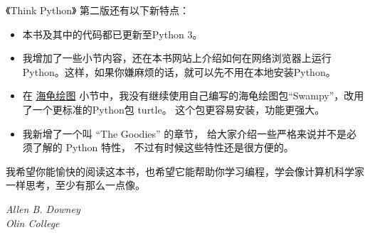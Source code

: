 
《Think Python》 第二版还有以下新特点：

\begin{itemize}

\item 本书及其中的代码都已更新至Python 3。

\item 我增加了一些小节内容，还在本书网站上介绍如何在网络浏览器上运行Python。这样，如果你嫌麻烦的话，就可以先不用在本地安装Python。

\item 在 \hyperref[turtle]{海龟绘图} 小节中，我没有继续使用自己编写的海龟绘图包``Swampy''，改用了一个更标准的Python包 turtle。 这个包更容易安装，功能更强大。

\item 我新增了一个叫 ``The Goodies'' 的章节， 给大家介绍一些严格来说并不是必须了解的 Python 特性， 不过有时候这些特性还是很方便的。

\end{itemize}


我希望你能愉快的阅读这本书，也希望它能帮助你学习编程，学会像计算机科学家一样思考，至少有那么一点像。

{\em Allen B. Downey} \\

{\em Olin College} \\


